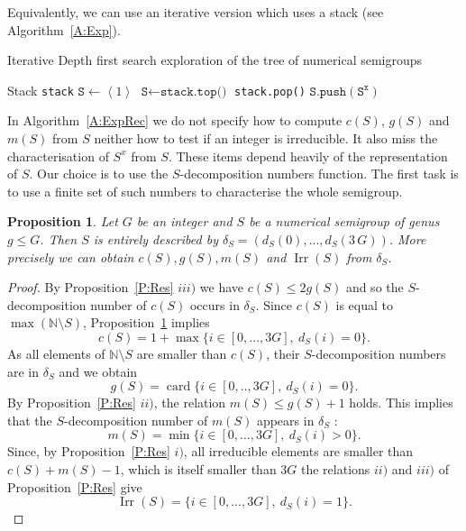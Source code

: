 \documentclass[reqno,11pt]{amsart}
\theoremstyle{plain}
\newtheorem{prop}{Proposition}[section]
\theoremstyle{definition}
\renewcommand{\leq}{\leqslant}
\newcommand{\NN}{\mathbb{N}}
\renewcommand{\tt}[1]{\texttt{#1}}
\DeclareMathOperator{\Irr}{Irr}
\DeclareMathOperator{\card}{card}
\begin{document}
Equivalently, we can use an iterative version which uses a stack (see Algorithm~\ref{A:Exp}).
\begin{algorithm}
\caption{Iterative Depth first search exploration of the tree of numerical semigroups}\label{A:Exp}
\begin{algorithmic}[1]
\Procedure{Explore}{\tt{G}}
\State Stack \tt{stack} 
\State $\tt{S} \gets\left<1\right>$
	\State $\tt{S} \gets \tt{stack.top()}$
	\State \tt{stack.pop()}
	\If{$g(\tt{S})< \tt{G}$}
		\For{\tt{x} from $c(\tt{S})$ to $c(\tt{S})+m(\tt{S})$}
			\If{$\tt{x}\in \Irr(\tt{S})$}
				\State $\tt{S.push}(\tt{S}^\tt{x})$
			\EndIf
		\EndFor
	\EndIf
\EndWhile
\EndProcedure
\end{algorithmic}
\end{algorithm}

In Algorithm~\ref{A:ExpRec} we do not specify how to compute $c(S)$, $g(S)$ and $m(S)$  from $S$ neither how to test if an integer is irreducible. 
It also miss  the characterisation of $S^x$ from $S$.
These items depend heavily of the representation of $S$.
Our choice is to use the $S$-decomposition numbers function. 
The first task is to use a finite set of such numbers to characterise the whole semigroup.

\begin{prop}
\label{P:delta}
Let $G$ be an integer and $S$ be a numerical semigroup of genus $g\leq G$.
Then $S$ is entirely described by $\delta_S=(d_S(0),...,d_S(3\,G))$. More precisely we can obtain $c(S), g(S), m(S)$ and $\Irr(S)$ from $\delta_S$.
\end{prop} 

\begin{proof}
By Proposition~\ref{P:Res} $iii)$ we have $c(S)\leq 2g(S)$ and so the $S$-decomposition number of $c(S)$ occurs in $\delta_S$.
Since $c(S)$ is equal to $\max(\NN\setminus S)$, Proposition~\ref{P:delta} implies 
\[
c(S)=1+\max\{i\in[0,...,3G],\ d_S(i)=0\}.
\]
As all elements of $\NN\setminus S$ are smaller than $c(S)$, their $S$-decomposition numbers are in $\delta_S$ and we obtain
\[
g(S)=\card\{i\in[0,..,3G],\ d_S(i)=0\}.
\]
By Proposition~\ref{P:Res} $ii)$, the relation $m(S)\leq g(S)+1$ holds. 
This implies that the $S$-decomposition number of $m(S)$ appears in $\delta_S$ : 
\[
m(S)=\min\{i\in[0,...,3G],\ d_S(i)>0\}.
\]
Since, by Proposition~\ref{P:Res} $i)$,  all irreducible elements are smaller than $c(S)+m(S)-1$, which is itself smaller than $3G$ the relations $ii)$ and $iii)$ of Proposition~\ref{P:Res} give
\[
\Irr(S)=\{i\in[0,...,3G],\ d_S(i)=1\}.
\]
\end{proof}
\end{document}
